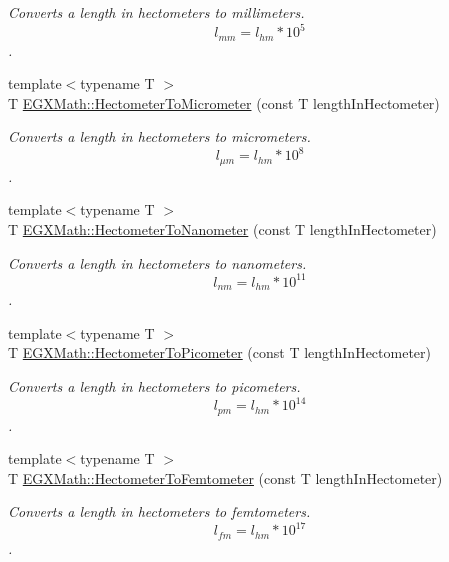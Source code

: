 \begin{DoxyCompactItemize}
\begin{DoxyCompactList}\small\item\em Converts a length in hectometers to millimeters. \[ l_{mm}=l_{hm} * 10^{5} \]. \end{DoxyCompactList}\item 
{\footnotesize template$<$typename T $>$ }\\T \mbox{\hyperlink{group___e_g_x_math-_conversions-_length_conversions-_hectometer-_s_i_ga3f5229b11d79e20007ac9320a317272a}{E\+G\+X\+Math\+::\+Hectometer\+To\+Micrometer}} (const T length\+In\+Hectometer)
\begin{DoxyCompactList}\small\item\em Converts a length in hectometers to micrometers. \[ l_{\mu m}=l_{hm} * 10^{8} \]. \end{DoxyCompactList}\item 
{\footnotesize template$<$typename T $>$ }\\T \mbox{\hyperlink{group___e_g_x_math-_conversions-_length_conversions-_hectometer-_s_i_gac9e19002288731e06d492cc5f8ee0a0e}{E\+G\+X\+Math\+::\+Hectometer\+To\+Nanometer}} (const T length\+In\+Hectometer)
\begin{DoxyCompactList}\small\item\em Converts a length in hectometers to nanometers. \[ l_{nm}=l_{hm} * 10^{11} \]. \end{DoxyCompactList}\item 
{\footnotesize template$<$typename T $>$ }\\T \mbox{\hyperlink{group___e_g_x_math-_conversions-_length_conversions-_hectometer-_s_i_gaa45a09cd750ee4e48680332f0ce39f07}{E\+G\+X\+Math\+::\+Hectometer\+To\+Picometer}} (const T length\+In\+Hectometer)
\begin{DoxyCompactList}\small\item\em Converts a length in hectometers to picometers. \[ l_{pm}=l_{hm} * 10^{14} \]. \end{DoxyCompactList}\item 
{\footnotesize template$<$typename T $>$ }\\T \mbox{\hyperlink{group___e_g_x_math-_conversions-_length_conversions-_hectometer-_s_i_gac1a1dfa64b70f5495ef5ea5c85b17677}{E\+G\+X\+Math\+::\+Hectometer\+To\+Femtometer}} (const T length\+In\+Hectometer)
\begin{DoxyCompactList}\small\item\em Converts a length in hectometers to femtometers. \[ l_{fm}=l_{hm} * 10^{17} \]. \end{DoxyCompactList}\item 

\end{DoxyCompactItemize}
